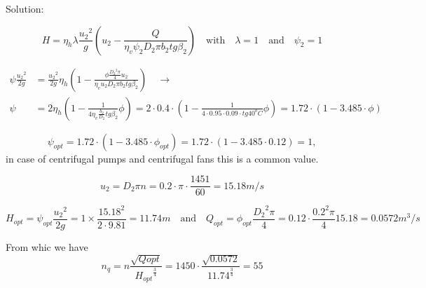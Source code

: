 \begin{tcolorbox}
Solution:

\begin{equation*}
H=\eta_h\lambda\frac{{u_2}^2}{g}\left(u_2-\frac{Q}{\eta_v\psi_2D_2\pi b_2tg\beta_2}\right)\quad \text{with}\quad  \lambda=1\quad  \text{and} \quad \psi_2=1
\end{equation*}

\begin{eqnarray}
\psi\frac{{u_2}^2}{2g}&=\frac{{u_2}^2}{2g}\eta_h\left(1-\frac{\phi\frac{{D_2}^2\pi}{4}u_2}{\eta_v u_2D_2\pi b_2tg\beta_2}\right)  \quad \rightarrow \quad\\
%
\psi&=2\eta_h\left(1-\frac{1}{4\eta_v\frac{b_2}{D_2}tg\beta_2}\phi\right)=2 \cdot 0.4 \cdot \left(1-\frac{1}{4 \cdot 0.95 \cdot 0.09 \cdot tg40^oC}\phi\right)=1.72 \cdot (1-3.485 \cdot \phi)
\end{eqnarray}

\begin{equation*}
\psi_{opt}=1.72 \cdot (1-3.485 \cdot \phi_{opt})=1.72 \cdot (1-3.485 \cdot 0.12)=1,
\end{equation*}
in case of centrifugal pumps and centrifugal fans this is a common value.

\begin{equation*}
u_2=D_2\pi n=0.2 \cdot \pi \cdot \frac{1451}{60}=15.18 m/s
\end{equation*}

\begin{equation*}
H_{opt}=\psi_{opt}\frac{{u_2}^2}{2g}=1 \times \frac{15.18^2}{2 \cdot 9.81}=11.74m
\quad  \text{and}  \quad
Q_{opt}=\phi_{opt}\frac{{D_2}^2\pi}{4}=0.12 \cdot \frac{0.2^2 \pi }{4} 15.18=0.0572 m^3/s 
\end{equation*}

From whic we have
%
\begin{equation*}
n_q=n\frac{\sqrt{Q{opt}}}{{H_{opt}}^{\frac{3}{4}}}=1450 \cdot \frac{\sqrt{0.0572}}{{11.74}^\frac{3}{4}}=55
\end{equation*}
\end{tcolorbox}


